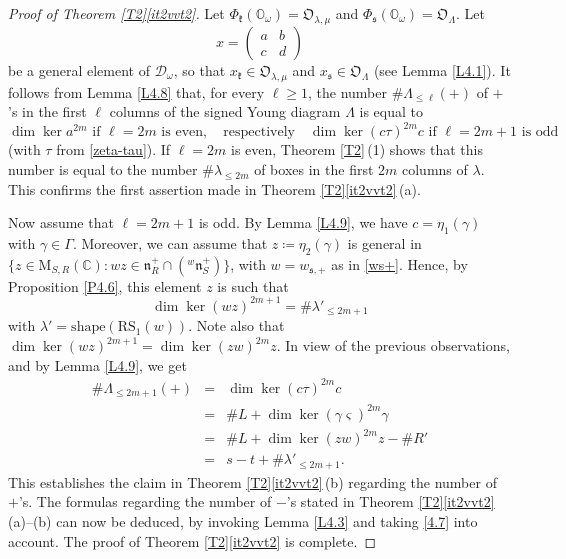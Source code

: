 \documentclass[ALCO,Unicode]{cedram}
\newcommand{\fk}{\mathfrak{k}}
\newcommand{\fs}{\mathfrak{s}}
\newcommand{\fn}{\mathfrak{n}}
\newcommand{\RS}{\mathrm{RS}}
\newcommand{\shape}{\mathrm{shape}}
\newcommand{\card}[1]{\# #1}
\newcommand{\nrboxes}[2]{\# #1_{\leq #2}}
\newcommand{\nrplus}[2]{\# #1_{\leq #2}(+)}
\newcommand{\Mat}{\mathrm{M}}
\newcommand{\Xorbit}{\mathbb{O}}
\newcommand{\Nkorbit}{\mathfrak{O}}
\newcommand{\Nsorbit}{\mathfrak{O}}
\newcommand{\mC}{\mathbb{C}}
\begin{document}
\begin{proof}[Proof of Theorem \ref{T2}\ref{it2vvt2}]
Let $\Phi_\fk(\Xorbit_\omega)=\Nkorbit_{\lambda,\mu}$ and $\Phi_\fs(\Xorbit_\omega)=\Nsorbit_\Lambda$.
Let
\[x=\begin{pmatrix}a & b\\ c & d\end{pmatrix}\]
be a general element of $\mathcal{D}_\omega$, so that $x_\fk\in\Nkorbit_{\lambda,\mu}$ and $x_\fs\in\Nsorbit_\Lambda$
(see Lemma \ref{L4.1}).
It follows from Lemma \ref{L4.8} that, for every $\ell\geq 1$,
the number $\nrplus{\Lambda}{\ell}$ of $+$'s in the first $\ell$ columns of the signed Young diagram $\Lambda$ is equal to
\[\dim\ker a^{2m}\mbox{ if $\ell=2m$ is even},\quad\mbox{respectively}\quad \dim \ker(c\tau)^{2m} c\mbox{ if $\ell=2m+1$ is odd}\]
(with $\tau$ from \eqref{zeta-tau}).
If $\ell=2m$ is even, Theorem \ref{T2}\,(1) shows that this number is equal to the number $\nrboxes{\lambda}{2m}$ of boxes in the first $2m$ columns of $\lambda$.
This confirms the first assertion made in Theorem \ref{T2}\ref{it2vvt2}\,(a).

Now assume that $\ell=2m+1$ is odd. By Lemma \ref{L4.9}, we have $c=\eta_1(\gamma)$ with $\gamma\in\Gamma$. Moreover, we can assume that $z\coloneqq \eta_2(\gamma)$ is general in $\{z\in\Mat_{S,R}(\mC):wz\in\fn_R^+\cap({}^w\fn_S^+)\}$,
with $w=w_{\fs,+}$ as in \eqref{ws+}. Hence, by Proposition \ref{P4.6}, this element $z$ is such that
\[
\dim \ker (wz)^{2m+1}=\nrboxes{\lambda'}{2m+1}
\]
with $\lambda'=\shape(\RS_1(w))$.
Note also that $\dim\ker(wz)^{2m+1}=\dim\ker(zw)^{2m}z$. In view of the previous observations, and by Lemma \ref{L4.9}, we get
\begin{eqnarray*}
\nrplus{\Lambda}{2m+1} & = & \dim \ker(c\tau)^{2m} c\\ & = & \card{L}+\dim \ker (\gamma\varsigma)^{2m}\gamma\\
 & = & \card{L}+\dim \ker(zw)^{2m}z-\card{R'}\\
 & = & s-t+\nrboxes{\lambda'}{2m+1}.
\end{eqnarray*}
This establishes the claim in Theorem \ref{T2}\ref{it2vvt2}\,(b) regarding the number of $+$'s. The formulas regarding the number of $-$'s stated in Theorem \ref{T2}\ref{it2vvt2}\,(a)--(b) can now be deduced, by invoking Lemma \ref{L4.3} and taking \eqref{4.7} into account. The proof of Theorem \ref{T2}\ref{it2vvt2} is complete.
\end{proof}








\end{document}
